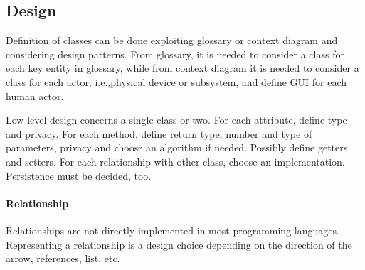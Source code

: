 \subsection{Design}
Definition of classes can be done exploiting glossary or context diagram and considering design patterns.
From glossary, it is needed to consider a class for each key entity in glossary, while from context diagram it is needed to consider a class for each actor, i.e.,\@ physical device or subsystem, and define GUI for each human actor.

Low level design concerns a single class or two. For each attribute, define type and privacy. For each method, define return type, number and type of parameters, privacy and choose an algorithm if needed. Possibly define getters and setters. For each relationship with other class, choose an implementation. Persistence must be decided, too.

\paragraph{Relationship}
Relationships are not directly implemented in most programming languages. Representing a relationship is a design choice depending on the direction of the arrow, references, list, etc.

